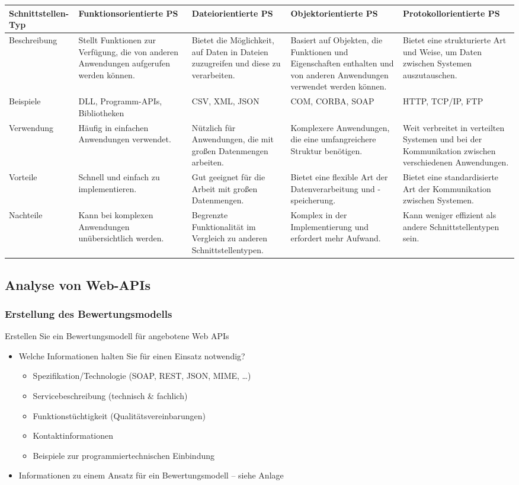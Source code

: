 \documentclass[notitlepage, hidelinks]{article}
\begin{document}
\begin{tabular}{|L{2cm}|L{2.8cm}|L{2.8cm}|L{2.8cm}|L{2.8cm}|}
\hline
Schnittstellen-Typ & Funktionsorientierte PS & Dateiorientierte PS & Objektorientierte PS & Protokollorientierte PS \\
\hline
Beschreibung & Stellt Funktionen zur Verfügung, die von anderen Anwendungen aufgerufen werden können. & Bietet die Möglichkeit, auf Daten in Dateien zuzugreifen und diese zu verarbeiten. & Basiert auf Objekten, die Funktionen und Eigenschaften enthalten und von anderen Anwendungen verwendet werden können. & Bietet eine strukturierte Art und Weise, um Daten zwischen Systemen auszutauschen. \\
\hline
Beispiele & DLL, Programm-APIs, Bibliotheken & CSV, XML, JSON & COM, CORBA, SOAP & HTTP, TCP/IP, FTP \\
\hline
Verwendung & Häufig in einfachen Anwendungen verwendet. & Nützlich für Anwendungen, die mit großen Datenmengen arbeiten. & Komplexere Anwendungen, die eine umfangreichere Struktur benötigen. & Weit verbreitet in verteilten Systemen und bei der Kommunikation zwischen verschiedenen Anwendungen. \\
\hline
Vorteile & Schnell und einfach zu implementieren. & Gut geeignet für die Arbeit mit großen Datenmengen. & Bietet eine flexible Art der Datenverarbeitung und -speicherung. & Bietet eine standardisierte Art der Kommunikation zwischen Systemen. \\
\hline
Nachteile & Kann bei komplexen Anwendungen unübersichtlich werden. & Begrenzte Funktionalität im Vergleich zu anderen Schnittstellentypen. & Komplex in der Implementierung und erfordert mehr Aufwand. & Kann weniger effizient als andere Schnittstellentypen sein. \\
\hline
\end{tabular}


\subsection{Analyse von Web-APIs}

\subsubsection{Erstellung des Bewertungsmodells}
Erstellen Sie ein Bewertungsmodell für angebotene Web APIs
\begin{itemize}
\item Welche Informationen halten Sie für einen Einsatz notwendig?
\begin{itemize}
\item Spezifikation/Technologie (SOAP, REST, JSON, MIME, …)
\item Servicebeschreibung (technisch \& fachlich)
\item Funktionstüchtigkeit (Qualitätsvereinbarungen)
\item Kontaktinformationen
\item Beispiele zur programmiertechnischen Einbindung
\end{itemize}
\item Informationen zu einem Ansatz für ein Bewertungsmodell – siehe Anlage
\end{itemize}
\end{document}
